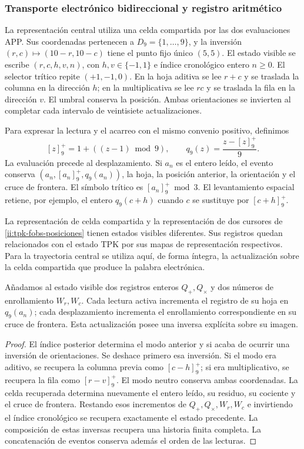 \subsubsection{Transporte electrónico bidireccional y registro aritmético}
\label{ii:transporte-electronico}

La representación central utiliza una celda compartida por las dos
evaluaciones APP. Sus coordenadas pertenecen a \(D_9=\{1,\ldots,9\}\),
y la inversión \((r,c)\mapsto(10-r,10-c)\) tiene el punto fijo único
\((5,5)\). El estado visible se escribe \((r,c,h,v,n)\), con
\(h,v\in\{-1,1\}\) e índice cronológico entero \(n\geq0\).
El selector trítico repite \((+1,-1,0)\). En la hoja aditiva se lee
\(r+c\) y se traslada la columna en la dirección \(h\); en la
multiplicativa se lee \(rc\) y se traslada la fila en la dirección
\(v\). El umbral conserva la posición. Ambas orientaciones se
invierten al completar cada intervalo de veintisiete actualizaciones.

Para expresar la lectura y el acarreo con el mismo convenio positivo,
definimos
\[
 [z]^+_9=1+((z-1)\bmod9),\qquad
 q_9(z)=\frac{z-[z]^+_9}{9}.
\]
La evaluación precede al desplazamiento. Si \(a_n\) es el entero
leído, el evento conserva \((a_n,[a_n]^+_9,q_9(a_n))\), la hoja,
la posición anterior, la orientación y el cruce de frontera. El
símbolo trítico es \([a_n]^+_9\bmod3\). El levantamiento espacial
retiene, por ejemplo, el entero
\(q_9(c+h)\) cuando \(c\) se sustituye por \([c+h]^+_9\).

La representación de celda compartida y la representación de dos
cursores de \eqref{ii:tpk-fobs-posiciones} tienen estados visibles
diferentes. Sus registros quedan relacionados con el estado TPK por
sus mapas de representación respectivos. Para la trayectoria central
se utiliza aquí, de forma íntegra, la actualización sobre la celda
compartida que produce la palabra electrónica.

\begin{proposition}
\label{ii:electron-inversa-cocientes}
Añadamos al estado visible dos registros enteros \(Q_+,Q_\times\)
y dos números de enrollamiento \(W_r,W_c\). Cada lectura activa
incrementa el registro de su hoja en \(q_9(a_n)\); cada desplazamiento
incrementa el enrollamiento correspondiente en su cruce de frontera.
Esta actualización posee una inversa explícita sobre su imagen.
\end{proposition}
\begin{proof}
El índice posterior determina el modo anterior y si acaba de ocurrir
una inversión de orientaciones. Se deshace primero esa inversión.
Si el modo era aditivo, se recupera la columna previa como
\([c-h]^+_9\); si era multiplicativo, se recupera la fila como
\([r-v]^+_9\). El modo neutro conserva ambas coordenadas. La celda
recuperada determina nuevamente el entero leído, su residuo, su
cociente y el cruce de frontera. Restando esos incrementos de
\(Q_+,Q_\times,W_r,W_c\) e invirtiendo el índice cronológico se
recupera exactamente el estado precedente. La composición de estas
inversas recupera una historia finita completa. La concatenación de
eventos conserva además el orden de las lecturas.
\end{proof}

